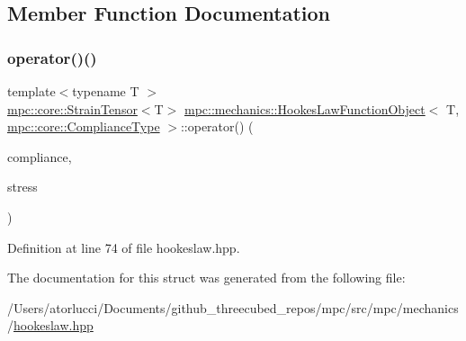 \subsection{Member Function Documentation}
\mbox{\label{structmpc_1_1mechanics_1_1_hookes_law_function_object_3_01_t_00_01mpc_1_1core_1_1_compliance_type_01_4_a55619695ae289395963ed9106f470704}} 
\subsubsection{\texorpdfstring{operator()()}{operator()()}}
{\footnotesize\ttfamily template$<$typename T $>$ \\
\mbox{\hyperlink{structmpc_1_1core_1_1_strain_tensor}{mpc\+::core\+::\+Strain\+Tensor}}$<$T$>$ \mbox{\hyperlink{structmpc_1_1mechanics_1_1_hookes_law_function_object}{mpc\+::mechanics\+::\+Hookes\+Law\+Function\+Object}}$<$ T, \mbox{\hyperlink{structmpc_1_1core_1_1_compliance_type}{mpc\+::core\+::\+Compliance\+Type}} $>$\+::operator() (\begin{DoxyParamCaption}\item[{\mbox{\hyperlink{structmpc_1_1core_1_1_compliance_tensor}{mpc\+::core\+::\+Compliance\+Tensor}}$<$ T $>$ \&}]{compliance,  }\item[{\mbox{\hyperlink{structmpc_1_1core_1_1_stress_tensor}{mpc\+::core\+::\+Stress\+Tensor}}$<$ T $>$ \&}]{stress }\end{DoxyParamCaption})\hspace{0.3cm}{\ttfamily [inline]}}



Definition at line 74 of file hookeslaw.\+hpp.



The documentation for this struct was generated from the following file\+:\begin{DoxyCompactItemize}
\item 
/\+Users/atorlucci/\+Documents/github\+\_\+threecubed\+\_\+repos/mpc/src/mpc/mechanics/\mbox{\hyperlink{hookeslaw_8hpp}{hookeslaw.\+hpp}}\end{DoxyCompactItemize}
